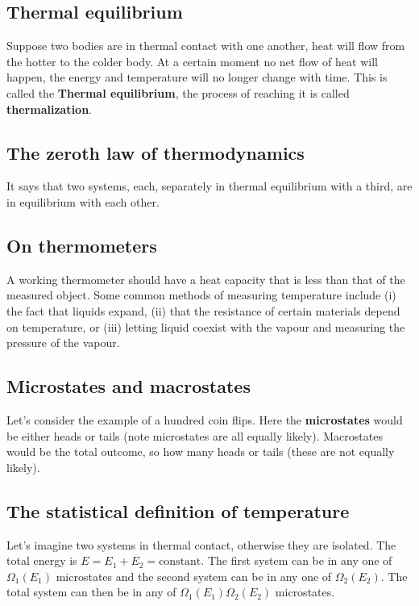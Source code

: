 \documentclass[a4paper]{article}
\begin{document}
\subsection{Thermal equilibrium}

Suppose two bodies are in thermal contact with one another, heat will flow from the hotter to the colder body. At a certain moment no net flow of heat will happen, the energy and temperature will no longer change with time. This is called the \textbf{Thermal equilibrium}, the process of reaching it is called \textbf{thermalization}.

\subsection{The zeroth law of thermodynamics}

It says that two systems, each, separately in thermal equilibrium with a third, are in equilibrium with each other. 

\subsection{On thermometers}

A working thermometer should have a heat capacity that is less than that of the measured object. Some common methods of measuring temperature include (i) the fact that liquids expand, (ii) that the resistance of certain materials depend on temperature, or (iii) letting liquid coexist with the vapour and measuring the pressure of the vapour.

\subsection{Microstates and macrostates}

Let's consider the example of a hundred coin flips. Here the \textbf{microstates} would be either heads or tails (note microstates are all equally likely). Macrostates would be the total outcome, so how many heads or tails (these are not equally likely).

\subsection{The statistical definition of temperature}

Let's imagine two systems in thermal contact, otherwise they are isolated. The total energy is $E=E_1+E_2=\text{constant}$. The first system can be in any one of $\Omega_1(E_1)$ microstates and the second system can be in any one of $\Omega_2(E_2)$. The total system can then be in any of $\Omega_1(E_1)\Omega_2(E_2)$ microstates.
\end{document}

